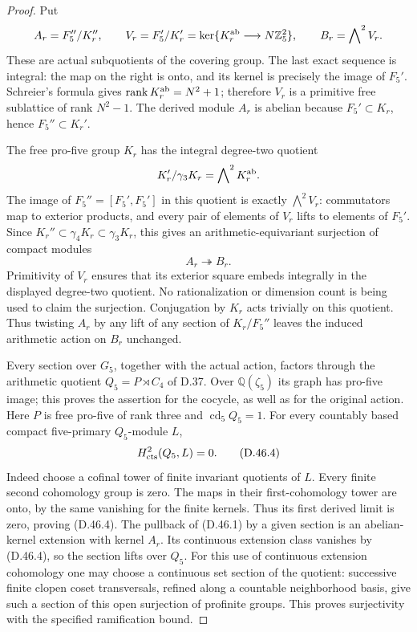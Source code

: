 \begin{proof}
Put
\[
 A_r=F_5''/K_r'',\qquad
 V_r=F_5'/K_r'
      =\ker\{K_r^{\rm ab}\longrightarrow N\mathbb Z_5^2\},
 \qquad B_r=\bigwedge\nolimits^2 V_r .
\]
These are actual subquotients of the covering
group. The last exact sequence is integral:
the map on the right is onto, and its
kernel is precisely the image of \(F_5'\).
Schreier's formula gives
\(\operatorname{rank}K_r^{\rm ab}=N^2+1\);
therefore \(V_r\) is a primitive free
sublattice of rank \(N^2-1\).
The derived module \(A_r\) is abelian
because \(F_5'\subset K_r\), hence
\(F_5''\subset K_r'\).

The free pro-five group \(K_r\) has the
integral degree-two quotient
\[
       K_r'/\gamma_3K_r
                     =\bigwedge\nolimits^2K_r^{\rm ab}.
\]
The image of \(F_5''=[F_5',F_5']\) in this
quotient is exactly \(\bigwedge^2V_r\):
commutators map to exterior products, and
every pair of elements of \(V_r\) lifts to
elements of \(F_5'\). Since
\(K_r''\subset\gamma_4K_r\subset\gamma_3K_r\),
this gives an arithmetic-equivariant
surjection of compact modules
\[
                         A_r\twoheadrightarrow B_r.            \tag{D.46.3}
\]
Primitivity of \(V_r\) ensures that its
exterior square embeds integrally in the
displayed degree-two quotient. No
rationalization or dimension count is
being used to claim the surjection.
Conjugation by \(K_r\) acts trivially on
this quotient. Thus twisting \(A_r\) by
any lift of any section of \(K_r/F_5''\)
leaves the induced arithmetic action on
\(B_r\) unchanged.

Every section over \(G_5\), together with
the actual action, factors through the
arithmetic quotient \(Q_5=P\rtimes C_4\)
of D.37. Over \(\mathbb Q(\zeta_5)\)
its graph has pro-five image; this proves
the assertion for the cocycle, as well
as for the original action. Here \(P\)
is free pro-five of rank three and
\(\operatorname{cd}_5 Q_5=1\).
For every countably based compact
five-primary \(Q_5\)-module \(L\),
\[
                         H^2_{\rm cts}(Q_5,L)=0.               \tag{D.46.4}
\]
Indeed choose a cofinal tower of finite
invariant quotients of \(L\). Every finite
second cohomology group is zero.
The maps in their first-cohomology tower
are onto, by the same vanishing for
the finite kernels. Thus its first
derived limit is zero, proving (D.46.4).
The pullback of (D.46.1) by a given
section is an abelian-kernel extension
with kernel \(A_r\). Its continuous
extension class vanishes by (D.46.4),
so the section lifts over \(Q_5\).
For this use of continuous extension
cohomology one may choose a continuous
set section of the quotient: successive
finite clopen coset transversals, refined
along a countable neighborhood basis,
give such a section of this open
surjection of profinite groups.
This proves surjectivity with the
specified ramification bound.


\end{proof}
